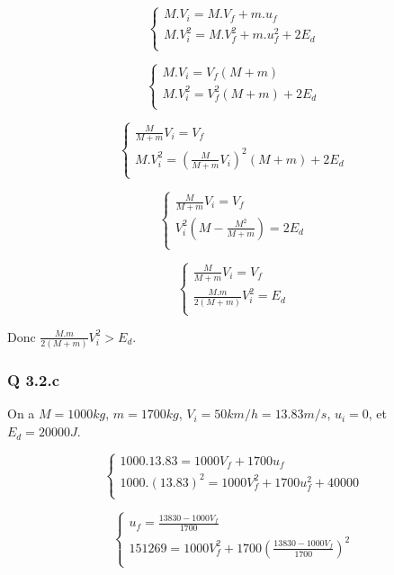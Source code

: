 \documentclass[]{book}
\theoremstyle{definition}
\begin{document}
$$
\left\{ 
\begin{array}{l}
 M.V_i =  M.V_f + m.u_f \\
 M.V_i^2  = M.V_f^2 + m.u_f^2 + 2E_d\\
\end{array}
\right. 
$$

$$
\left\{ 
\begin{array}{l}
 M.V_i =  V_f(M + m) \\
 M.V_i^2  = V_f^2(M + m) + 2E_d\\
\end{array}
\right. 
$$

$$
\left\{ 
\begin{array}{l}
 \frac{M}{M+m}V_i =  V_f \\
 M.V_i^2  = (\frac{M}{M+m}V_i)^2(M + m) + 2E_d\\
\end{array}
\right. 
$$

$$
\left\{ 
\begin{array}{l}
 \frac{M}{M+m}V_i =  V_f \\
 V_i^2(M -\frac{M^2}{M+m}) = 2E_d\\
\end{array}
\right. 
$$

$$
\left\{ 
\begin{array}{l}
 \frac{M}{M+m}V_i =  V_f \\
 \frac{M.m}{2(M+m)}V_i^2 = E_d\\
\end{array}
\right. 
$$

Donc $\frac{M.m}{2(M+m)}V_i^2 > E_d$.

\subsubsection*{Q 3.2.c}
On a $M=1000kg$, $m=1700kg$, $V_i = 50km/h = 13.83m/s$, $u_i = 0$, et $E_d=20000J$.

$$
\left\{ 
\begin{array}{l}
 1000.13.83 = 1000V_f + 1700u_f \\
 1000.(13.83)^2  = 1000V_f^2 + 1700u_f^2 + 40000\\
\end{array}
\right. 
$$

$$
\left\{ 
\begin{array}{l}
 u_f = \frac{13830 - 1000V_f}{1700}\\
 151269  = 1000V_f^2 + 1700(\frac{13830- 1000V_f}{1700})^2\\
\end{array}
\right. 
$$
\end{document}
